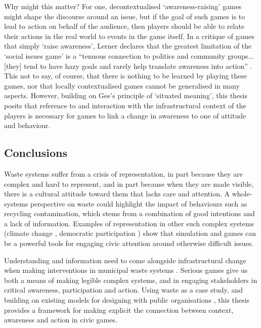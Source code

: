 \documentclass[nofonts,nols,justified,nobib]{tufte-book}
\begin{document}
Why might this matter? For one, decontextualised `awareness-raising' games might shape the discourse around an issue, but if the goal of such games is to lead to action on behalf of the audience, then players should be able to relate their actions in the real world to events in the game itself. In a critique of games that simply `raise awareness', Lerner declares that the greatest limitation of the `social issues game' is a ``tenuous connection to politics and community groups... [they] tend to have hazy goals and rarely help translate awareness into action'' \cite{lerner_making_2014}. This not to say, of course, that there is nothing to be learned by playing these games, nor that locally contextualised games cannot be generalised in many aspects. However, building on Gee's principle of `situated meaning', this thesis posits that reference to and interaction with the infrastructural context of the players is necessary for games to link a change in awareness to one of attitude and behaviour. \newpage

\subsection*{Conclusions}
Waste systems suffer from a crisis of representation, in part because they are complex and hard to represent, and in part because when they are made visible, there is a cultural attitude toward them that lacks care and attention. A whole-systems perspective on waste could highlight the impact of behaviours such as recycling contamination, which stems from a combination of good intentions and a lack of information. Examples of representation in other such complex systems (climate change \cite{sterman_world_2015, macklin_games_2013}, democratic participation \cite{lerner_making_2014, case_build_2016}) show that simulation and games can be a powerful tools for engaging civic attention around otherwise difficult issues.

Understanding and information need to come alongside infrastructural change when making interventions in municipal waste systems \cite{kline_rationalizing_1988}. Serious games give us both a means of making legible complex systems, and in engaging stakeholders in critical awareness, participation and action. Using waste as a case study, and building on existing models for designing with public organisations \cite{schaminee_designing_2018}, this thesis provides a framework for making explicit the connection between context, awareness and action in civic games.
\end{document}
